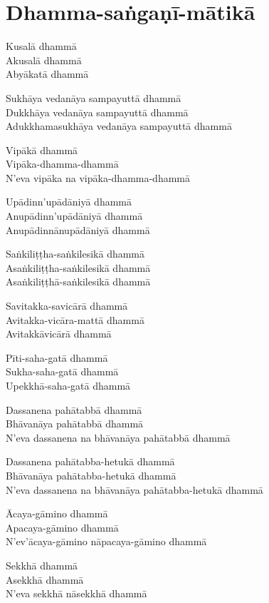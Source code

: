 
\chapter{Dhamma-saṅgaṇī-mātikā}%

\begin{paritta}
Kusalā dhammā\\
Akusalā dhammā\\
Abyākatā dhammā

Sukhāya vedanāya sampayuttā dhammā\\
Dukkhāya vedanāya sampayuttā dhammā\\
Adukkhamasukhāya vedanāya sampayuttā dhammā

Vipākā dhammā\\
Vipāka-dhamma-dhammā\\
N'eva vipāka na vipāka-dhamma-dhammā

Upādinn'upādāniyā dhammā\\
Anupādinn'upādāniyā dhammā\\
Anupādinnānupādāniyā dhammā

Saṅkiliṭṭha-saṅkilesikā dhammā\\
Asaṅkiliṭṭha-saṅkilesikā dhammā\\
Asaṅkiliṭṭhā-saṅkilesikā dhammā

Savitakka-savicārā dhammā\\
Avitakka-vicāra-mattā dhammā\\
Avitakkāvicārā dhammā

Pīti-saha-gatā dhammā\\
Sukha-saha-gatā dhammā\\
Upekkhā-saha-gatā dhammā

Dassanena pahātabbā dhammā\\
Bhāvanāya pahātabbā dhammā\\
N'eva dassanena na bhāvanāya pahātabbā dhammā

Dassanena pahātabba-hetukā dhammā\\
Bhāvanāya pahātabba-hetukā dhammā\\
N'eva dassanena na bhāvanāya pahātabba-hetukā dhammā

Ācaya-gāmino dhammā\\
Apacaya-gāmino dhammā\\
N'ev'ācaya-gāmino nāpacaya-gāmino dhammā

Sekkhā dhammā\\
Asekkhā dhammā\\
N'eva sekkhā nāsekkhā dhammā


\end{paritta}
